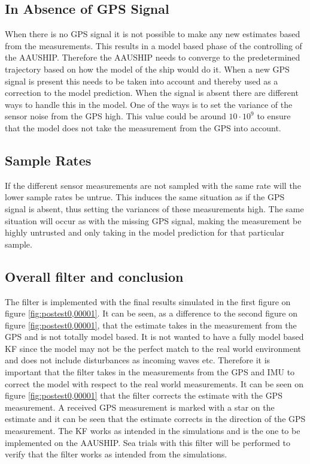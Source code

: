 \subsection{In Absence of \ac{GPS} Signal}
When there is no \ac{GPS} signal it is not possible to make any new estimates based from the measurements. This results in a model based phase of the controlling of the AAUSHIP. Therefore the AAUSHIP needs to converge to the predetermined trajectory based on how the model of the ship would do it. When a new \ac{GPS} signal is present this needs to be taken into account and thereby used as a correction to the model prediction. When the signal is absent there are different ways to handle this in the model. One of the ways is to set the variance of the sensor noise from the \ac{GPS} high. This value could be around $10 \cdot 10^9$ to ensure that the model does not take the measurement from the \ac{GPS} into account.

\subsection{Sample Rates}
If the different sensor measurements are not sampled with the same rate will the lower sample rates be untrue. This induces the same situation as if the \ac{GPS} signal is absent, thus setting the variances of these measurements high. The same situation will occur as with the missing \ac{GPS} signal, making the measurement be highly untrusted and only taking in the model prediction for that particular sample.

\subsection{Overall filter and conclusion}
The filter is implemented with the final results simulated in the first figure on figure \ref{fig:postest0,00001}. It can be seen, as a difference to the second figure on figure \ref{fig:postest0,00001}, that the estimate takes in the measurement from the \ac{GPS} and is not totally model based. It is not wanted to have a fully model based \ac{KF} since the model may not be the perfect match to the real world environment and does not include disturbances as incoming waves etc. Therefore it is important that the filter takes in the measurements from the \ac{GPS} and \ac{IMU} to correct the model with respect to the real world measurements. It can be seen on figure \ref{fig:postest0,00001} that the filter corrects the estimate with the \ac{GPS} measurement. A received \ac{GPS} measurement is marked with a star on the estimate and it can be seen that the estimate corrects in the direction of the \ac{GPS} measurement. The \ac{KF} works as intended in the simulations and is the one to be implemented on the AAUSHIP. Sea trials with this filter will be performed to verify that the filter works as intended from the simulations. 

